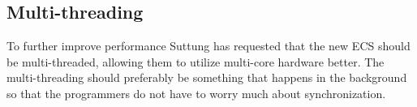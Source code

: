 
\subsection{Multi-threading}
\label{subsec:requirements_performance_multi_threading}
To further improve performance Suttung has requested that the new ECS should be multi-threaded, allowing them to utilize multi-core hardware better.
The multi-threading should preferably be something that happens in the background so that the programmers do not have to worry much about synchronization.

